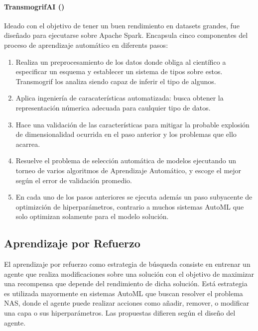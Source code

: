         \paragraph{TransmogrifAI (\cite{tovbin93meet})}  Ideado con el objetivo de tener un buen rendimiento en datasets grandes, fue dise\~nado para ejecutarse sobre Apache Spark. Encapsula cinco componentes del proceso de aprendizaje autom\'atico en diferents pasos:
        \begin{enumerate}
            \item Realiza un preprocesamiento de los datos donde obliga al cient\'ifico a especificar un esquema y establecer un sistema de tipos sobre estos. Transmogrif los analiza siendo capaz de inferir el tipo de algunos.
            \item Aplica ingenier\'ia de caracater\'isticas automatizada: busca obtener la representaci\'on n\'umerica adecuada para caulquier tipo de datos.
            \item Hace una validaci\'on de las caracter\'isticas para mitigar  la probable explosi\'on de dimensionalidad ocurrida en el paso anterior y los problemas que ello acarrea.
            \item Resuelve el problema de selecci\'on autom\'atica de modelos ejecutando un torneo de varios algoritmos de Aprendizaje Autom\'atico, y escoge el mejor seg\'un el error de validaci\'on promedio.
            \item En cada uno de los pasos anteriores se ejecuta adem\'as un paso subyacente de optimizci\'on de hiperpar\'ametros, contrario a  muchos sistemas AutoML que solo optimizan solamente para el modelo soluci\'on. 
        \end{enumerate}


\subsection{Aprendizaje por Refuerzo}
El aprendizaje por refuerzo como estrategia de b\'usqueda consiste en entrenar un agente que realiza modificaciones sobre una soluci\'on con el objetivo de maximizar una recompensa que depende del rendimiento de dicha soluci\'on. Est\'a estrategia es utilizada mayormente en sistemas AutoML que buscan resolver el problema NAS, donde el agente puede realizar acciones como a\~nadir, remover, o modificar una capa o sus hiperpar\'ametros. Las propuestas difieren seg\'un el dise\~no del agente.

